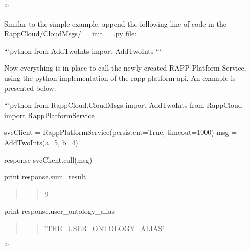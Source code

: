 ```

Similar to the simple-\/example, append the following line of code in the {\ttfamily Rapp\-Cloud/\-Cloud\-Msgs/\-\_\-\-\_\-init\-\_\-\-\_\-.\-py} file\-:

```python from Add\-Two\-Ints import Add\-Two\-Ints ```

Now everything is in place to call the newly created R\-A\-P\-P Platform Service, using the python implementation of the rapp-\/platform-\/api. An example is presented below\-:

```python from Rapp\-Cloud.\-Cloud\-Msgs import Add\-Two\-Ints from Rapp\-Cloud import Rapp\-Platform\-Service

svc\-Client = Rapp\-Platform\-Service(persistent=True, timeout=1000) msg = Add\-Two\-Ints(a=5, b=4)

response svc\-Client.\-call(msg)

print response.\-sum\-\_\-result \begin{quotation}
\begin{quotation}
9

\end{quotation}


\end{quotation}
print response.\-user\-\_\-ontology\-\_\-alias \begin{quotation}
\begin{quotation}
\char`\"{}\-T\-H\-E\-\_\-\-U\-S\-E\-R\-\_\-\-O\-N\-T\-O\-L\-O\-G\-Y\-\_\-\-A\-L\-I\-A\-S\char`\"{}

\end{quotation}


\end{quotation}
``` 